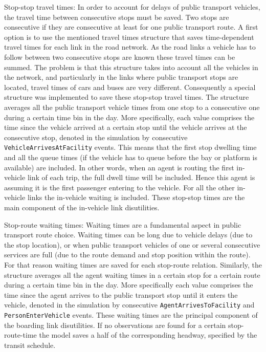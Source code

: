 \begin{compactitem}
\item Stop-stop travel times: In order to account for delays of public transport vehicles, the travel time between consecutive stops must be saved. Two stops are consecutive if they are consecutive at least for one public transport route. A first option is to use the mentioned travel times structure that saves time-dependent travel times for each link in the road network. As the road links a vehicle has to follow between two consecutive stops are known these travel times can be summed. The problem is that this structure takes into account all the vehicles in the network, and particularly in the links where public transport stops are located, travel times of cars and buses are very different. Consequently a special structure was implemented to save these stop-stop travel times. The structure averages all the public transport vehicle times from one stop to a consecutive one during a certain time bin in the day. More specifically, each value comprises the time since the vehicle arrived at a certain stop until the vehicle arrives at the consecutive stop, denoted in the simulation by consecutive \lstinline|VehicleArrivesAtFacility| events. This means that the first stop dwelling time and all the queue times (if the vehicle has to queue before the bay or platform is available) are included. In other words, when an agent is routing the first in-vehicle link of each trip, the full dwell time will be included. Hence this agent is assuming it is the first passenger entering to the vehicle. For all the other in-vehicle links the in-vehicle waiting is included. These stop-stop times are the main component of the in-vehicle link disutilities.
%
\item Stop-route waiting times: Waiting times are a fundamental aspect in public transport route choice. Waiting times can be long due to vehicle delays (\ie due to the stop location), or when public transport vehicles of one or several consecutive services are full (\ie due to the route demand and stop position within the route). For that reason waiting times are saved for each stop-route relation. Similarly, the structure averages all the agent waiting times in a certain stop for a certain route during a certain time bin in the day. More specifically each value comprises the time since the agent arrives to the public transport stop until it enters the vehicle, denoted in the simulation by consecutive \lstinline|AgentArrivesToFacility| and \lstinline|PersonEnterVehicle| \glspl{event}. These waiting times are the principal component of the boarding link disutilities. If no observations are found for a certain stop-route-time the model saves a half of the corresponding headway, specified by the transit schedule.

\end{compactitem}
